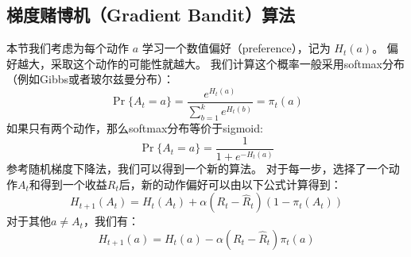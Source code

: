 \documentclass[11pt]{ctexart}
\begin{document}
    \hypertarget{ux68afux5ea6ux8d4cux535aux673agradient-banditux7b97ux6cd5}{%
\subsection{梯度赌博机（Gradient
Bandit）算法}\label{ux68afux5ea6ux8d4cux535aux673agradient-banditux7b97ux6cd5}}

本节我们考虑为每个动作 \(a\) 学习一个数值偏好（preference），记为
\(H_t(a)\)。 偏好越大，采取这个动作的可能性就越大。
我们计算这个概率一般采用softmax分布（例如Gibbs或者玻尔兹曼分布）：
\[\Pr{\{A_t=a\}}=\frac{e^{H_t(a)}}{\sum_{b=1}^k e^{H_t(b)}}=\pi_t(a)\]
如果只有两个动作，那么softmax分布等价于sigmoid:
\[\Pr{\{A_t=a\}}=\frac{1}{1+ e^{-H_t(a)}}\]
参考随机梯度下降法，我们可以得到一个新的算法。
对于每一步，选择了一个动作\(A_t\)和得到一个收益\(R_t\)后，新的动作偏好可以由以下公式计算得到：
\[H_{t+1}(A_t) = H_t(A_t) + \alpha (R_t - \hat{R}_t)(1-\pi_t(A_t))\]
对于其他\(a\ne A_t\)，我们有：
\[H_{t+1}(a) = H_t(a) - \alpha (R_t - \hat{R}_t)\pi_t(a)\]
\end{document}
